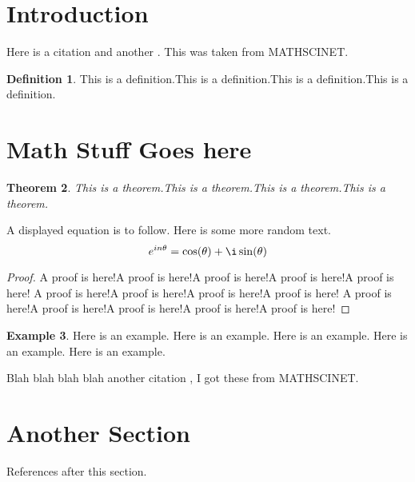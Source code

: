 \documentclass[12 pt]{article}
\theoremstyle{plain}
\newtheorem{theorem}{Theorem}[section]
\theoremstyle{definition}
\newtheorem{definition}[theorem]{Definition}
\newtheorem{example}[theorem]{Example}
\begin{document}
\restoregeometry %
\section{Introduction}
\lipsum[1-2]%
Here is a citation \cite{Paulsen}and another \cite{Dritschel}. This was taken from MATHSCINET.
\begin{definition} 
This is a definition.This is a definition.This is a definition.This is a definition.
\end{definition}
\section{Math Stuff Goes here}
\lipsum[3-4]
\begin{theorem}
This is a theorem.This is a theorem.This is a theorem.This is a theorem.
\end{theorem}
\lipsum[4]%
 A displayed equation is to follow. Here is some more random text. 
\[e^{in\theta}=\cos(\theta)+\i \sin(\theta)\]
\lipsum[5]
\begin{proof}
A proof is here!A proof is here!A proof is here!A proof is here!A proof is here!
A proof is here!A proof is here!A proof is here!A proof is here!
A proof is here!A proof is here!A proof is here!A proof is here!A proof is here!
\end{proof}
\lipsum[5-9]
\begin{example}
Here is an example. Here is an example. Here is an example. Here is an example. Here is an example. 
\end{example}
Blah blah blah blah another citation \cite{Dritschel}, I got these from MATHSCINET. 
\lipsum[4-5]
\section{Another Section}
References after this section.  \lipsum[6] 
\newpage
\end{document}
